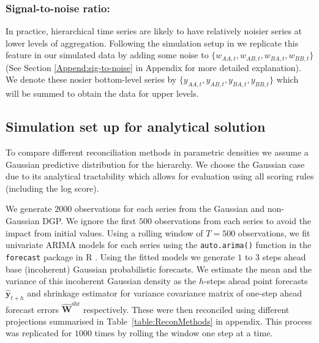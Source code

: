 \documentclass[12pt]{article}
\theoremstyle{definition}
\begin{document}
%

\subsubsection*{Signal-to-noise ratio:}

In practice, hierarchical time series are likely to have relatively noisier series at lower levels of aggregation. Following the simulation setup in \citet{WicEtAl2019} we replicate this feature in our simulated data by adding some noise to $\{w_{AA,t},w_{AB,t},w_{BA,t},w_{BB,t}\}$ (See Section \ref{Append:sig-to-noise} in Appendix for more detailed explanation). We denote these nosier bottom-level series by $\{y_{AA,t},y_{AB,t},y_{BA,t},y_{BB,t}\}$ which will be summed to obtain the data for upper levels.


\subsection{Simulation set up for analytical solution}

To compare different reconciliation methods in parametric densities we assume a Gaussian predictive distribution for the hierarchy. We choose the Gaussian case due to its analytical tractability which allows for evaluation using all scoring rules (including the log score).

We generate $2000$ observations for each series from the Gaussian and non-Gaussian DGP. We ignore the first $500$ observations from each series to avoid the impact from initial values. Using a rolling window of $T=500$ observations, we fit univariate ARIMA models for each series using the \verb|auto.arima()| function in the \verb|forecast| package \citep{Rforecast} in R \citep{Rcore}. Using the fitted models we generate $1$ to $3$ steps ahead base (incoherent) Gaussian probabilistic forecasts. We estimate the mean and the variance of this incoherent Gaussian density as the $h$-steps ahead point forecasts $\hat{\bm{y}}_{t+h}$ and shrinkage estimator for variance covariance matrix of one-step ahead forecast errors $\hat{\bm{W}}^{\text{shr}}$ respectively. These were then reconciled using different projections summarised in Table~\ref{table:ReconMethods} in appendix. This process was replicated for $1000$ times by rolling the window one step at a time.
\end{document}
